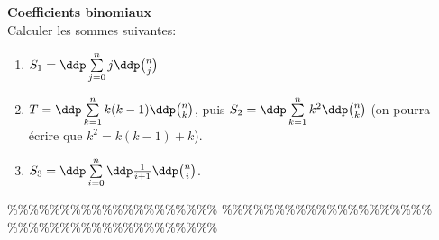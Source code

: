 



\begin{exercice} \; \textbf{Coefficients binomiaux} \\
Calculer les sommes suivantes: 
\begin{enumerate}
\item $S_1 = \ddp \sum\limits_{j=0}^n j\ddp \binom{n}{j}$
\item $T = \ddp \sum\limits_{k=1}^n k(k-1)\ddp \binom{n}{k}$, puis $S_2 = \ddp \sum\limits_{k=1}^n k^2\ddp \binom{n}{k}$ (on pourra \'ecrire que $k^2=k(k-1)+k$).
\item $S_3= \ddp \sum\limits_{i=0}^n \ddp\frac{1}{i+1}\ddp \binom{n}{i}$.
\end{enumerate}
\end{exercice}


\%\%\%\%\%\%\%\%\%\%\%\%\%\%\%\%\%\%\%\%
\%\%\%\%\%\%\%\%\%\%\%\%\%\%\%\%\%\%\%\%
\%\%\%\%\%\%\%\%\%\%\%\%\%\%\%\%\%\%\%\%




